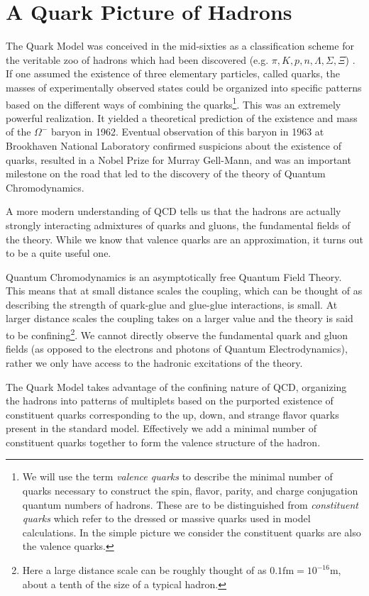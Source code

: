 \chapter{A Quark Picture of Hadrons} \label{chap::QM}

The Quark Model was conceived in the mid-sixties as a classification scheme for the veritable zoo of hadrons which had been discovered (e.g. $\pi, K,p,n,\Lambda,\Sigma,\Xi$) . If one assumed the existence of three elementary particles, called quarks, the masses of experimentally observed states could be organized into specific patterns based on the different ways of combining the quarks\footnote{We will use the term \emph{valence quarks} to describe the minimal number of quarks necessary to construct the spin, flavor, parity, and charge conjugation quantum numbers of hadrons. These are to be distinguished from \emph{constituent quarks} which refer to the dressed or massive quarks used in model calculations. In the simple picture we consider the constituent quarks are also the valence quarks.}. This was an extremely powerful realization. It yielded a theoretical prediction of the existence and mass of the $\Omega^-$ baryon in 1962. Eventual observation of this baryon in 1963 at Brookhaven National Laboratory confirmed suspicions about the existence of quarks, resulted in a Nobel Prize for Murray Gell-Mann, and was an important milestone on the road that led to the discovery of the theory of Quantum Chromodynamics.  

A more modern understanding of QCD tells us that the hadrons are actually strongly interacting admixtures of quarks and gluons, the fundamental fields of the theory.  While we know that valence quarks are an approximation, it turns out to be a quite useful one. 

Quantum Chromodynamics is an asymptotically free Quantum Field Theory. This means that at small distance scales the coupling, which can be thought of as describing the strength of quark-glue and glue-glue interactions, is small. At larger distance scales the coupling takes on a larger value and the theory is said to be confining\footnote{Here a large distance scale can be roughly thought of as $0.1\mathrm{fm} = 10^{-16}\mathrm{m}$, about a tenth of the size of a typical hadron.}. We cannot directly observe the fundamental quark and gluon fields (as opposed to the electrons and photons of Quantum Electrodynamics), rather we only have access to the hadronic excitations of the theory. 

The Quark Model takes advantage of the confining nature of QCD, organizing the hadrons into patterns of multiplets based on the purported existence of constituent quarks corresponding to the up, down, and strange flavor quarks present in the standard model. Effectively we add a minimal number of constituent quarks together to form the valence structure of the hadron. 

